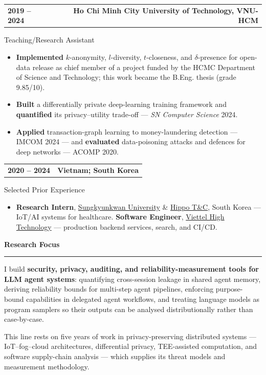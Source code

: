 \documentclass[11pt,a4paper]{article}
\makeatletter
\newcommand{\sectiontitle}[1]{%
  \Needspace{5\baselineskip}
  \vspace{0.28cm}%
  {\Large\bfseries #1}\par\vspace{0.08cm}\hrule\vspace{0.18cm}%
}
\newcommand{\headerline}[2]{%
  \noindent\begin{tabular*}{\textwidth}{@{}l@{\extracolsep{\fill}}r@{}}
  #1 & #2
  \end{tabular*}\par
}
\newcommand{\entry}[4]{%
  \vspace{0.16cm}
  \headerline{\textbf{#1}}{\textbf{#2}}
  {#3}\par
  #4
}
\makeatother
\begin{document}
\entry{2019 -- 2024}{Ho Chi Minh City University of Technology, VNU-HCM}
{Teaching/Research Assistant}
{\begin{itemize}
  \item \textbf{Implemented} $k$-anonymity, $l$-diversity, $t$-closeness, and $\delta$-presence for open-data release as chief member of a project funded by the HCMC Department of Science and Technology; this work became the B.Eng. thesis (grade 9.85/10).
  \item \textbf{Built} a differentially private deep-learning training framework and \textbf{quantified} its privacy--utility trade-off --- \textit{SN Computer Science} 2024.
  \item \textbf{Applied} transaction-graph learning to money-laundering detection --- IMCOM 2024 --- and \textbf{evaluated} data-poisoning attacks and defences for deep networks --- ACOMP 2020.
\end{itemize}}

\entry{2020 -- 2024}{Vietnam; South Korea}
{Selected Prior Experience}
{\begin{itemize}
  \item \textbf{Research Intern}, \href{https://www.skku.edu/eng/}{Sungkyunkwan University} \& \href{https://www.hippotnc.com/?lang=en}{Hippo T\&C}, South Korea --- IoT/AI systems for healthcare. \textbf{Software Engineer}, \href{https://www.viettelhightech.com/en}{Viettel High Technology} --- production backend services, search, and CI/CD.
\end{itemize}}

\sectiontitle{Research Focus}
I build \textbf{security, privacy, auditing, and reliability-measurement tools for LLM agent systems}: quantifying cross-session leakage in shared agent memory, deriving reliability bounds for multi-step agent pipelines, enforcing purpose-bound capabilities in delegated agent workflows, and treating language models as program samplers so their outputs can be analysed distributionally rather than case-by-case.

\vspace{0.15cm}
This line rests on five years of work in privacy-preserving distributed systems --- IoT--fog--cloud architectures, differential privacy, TEE-assisted computation, and software supply-chain analysis --- which supplies its threat models and measurement methodology.
\end{document}
